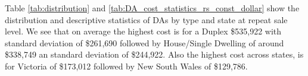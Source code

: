 \documentclass{article}
\begin{document}
Table \ref{tab:distribution} and \ref{tab:DA_cost_statistics_rs_const_dollar} show the distribution and descriptive statistics of DAs by type and state at repeat sale level. We see that on average the highest cost is for a Duplex \$535,922 with standard deviation of \$261,690 followed by House/Single Dwelling of around \$338,749 an standard deviation of \$244,922. Also the highest cost across states, is for Victoria of \$173,012 followed by New South Wales of \$129,786. 

%
%




%
%

%
%




%
\end{document}
